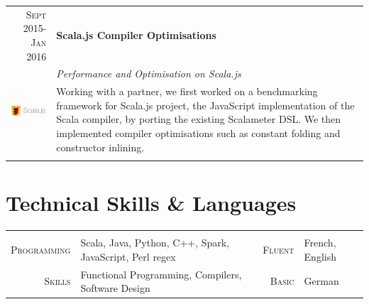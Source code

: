 \documentclass[a4paper,11pt]{article} %
\begin{document}
\begin{tabularx}{\textwidth}{r|X}

\textsc{Sept 2015-Jan 2016} & \textbf{Scala.js Compiler Optimisations} \\
\multirow{4}{*}{ \includegraphics[width=50pt]{img/scalajs.png}}
& \emph{Performance and Optimisation on Scala.js}\\ 
& \footnotesize{Working with a partner, we first worked on a
benchmarking framework for Scala.js project, the JavaScript implementation of
the Scala compiler, by porting the existing Scalameter DSL.
We then implemented compiler optimisations such as constant folding and
constructor inlining.}\\
\multicolumn{2}{c}{} \\


\end{tabularx}


\section{Technical Skills \& Languages}
\begin{center}

\vspace{-0.3cm}
\begin{tabularx}{\textwidth}{rX|rl}

& & & \\
\textsc{\large{Programming}} & Scala, Java, Python, C++, Spark, JavaScript, Perl regex &
\textsc{\large{Fluent}} & French, English \\
\textsc{\large{Skills}} & Functional Programming, Compilers, Software Design &
\textsc{\large{Basic}} & German \\

\end{tabularx}

\end{center}

\end{document}
